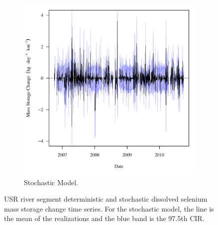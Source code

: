 \begin{linenumbers}
\begin{landscape}
\begin{figure}
\begin{subfigure}{0.7\textwidth}
			\includegraphics[width=\tableCustomSize]{"Figures/Results_USR/Stochastic/f Segment A"}
			\caption{Stochastic Model.}
		\end{subfigure}
		\caption[USR river segment deterministic and stochastic dissolved selenium mass storage change time series.]{USR river segment deterministic and stochastic dissolved selenium mass storage change time series.  For the stochastic model, the line is the mean of the realizations and the blue band is the 97.5th CIR.}
		\label{fig:massSegmentStoreChange_USR}
	\end{figure}
\end{landscape}


\end{linenumbers}
